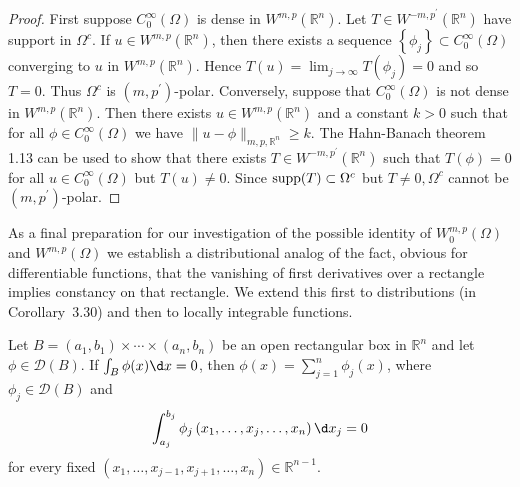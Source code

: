 \begin{proof}
  First suppose $C_0^{\infty}(\Omega)$ is dense in $W^{m,p}\left(\mathbb{R}^n\right)$. Let $T \in W^{-m, p^{\prime}}\left(\mathbb{R}^n\right)$ have support in $\Omega^c$. If $u \in W^{m,p}\left(\mathbb{R}^n\right)$, then there exists a sequence $\left\{\phi_j\right\} \subset C_0^{\infty}(\Omega)$ converging to $u$ in $W^{m,p}\left(\mathbb{R}^n\right)$. Hence $T(u)=\lim _{j \rightarrow \infty} T\left(\phi_j\right)=0$ and so $T=0$. Thus $\Omega^c$ is $\left(m, p^{\prime}\right)$-polar.
  Conversely, suppose that $C_0^{\infty}(\Omega)$ is not dense in $W^{m,p}\left(\mathbb{R}^n\right)$. Then there exists $u \in W^{m,p}\left(\mathbb{R}^n\right)$ and a constant $k>0$ such that for all $\phi \in C_0^{\infty}(\Omega)$ we have $\|u-\phi\|_{m, p, \mathbb{R}^n} \geq k$. The Hahn-Banach theorem 1.13 can be used to show that there exists $T \in W^{-m, p^{\prime}}\left(\mathbb{R}^n\right)$ such that $T(\phi)=0$ for all $u \in C_0^{\infty}(\Omega)$ but $T(u) \neq 0$. Since $\operatorname{supp}(T) \subset \Omega^c$ but $T \neq 0, \Omega^c$ cannot be $\left(m, p^{\prime}\right)$-polar.
\end{proof}

As a final preparation for our investigation of the possible identity of $W_0^{m, p}(\Omega)$ and $W^{m,p}(\Omega)$ we establish a distributional analog of the fact, obvious for differentiable functions, that the vanishing of first derivatives over a rectangle implies constancy on that rectangle. We extend this first to distributions (in Corollary~3.30) and then to locally integrable functions.


\begin{lemma}
  Let $B=\left(a_1, b_1\right) \times \cdots \times\left(a_n, b_n\right)$ be an open rectangular box in $\mathbb{R}^n$ and let $\phi \in \mathscr{D}(B)$. If $\int_B \phi(x) \d x=0$, then $\phi(x)=\sum_{j=1}^n \phi_j(x)$, where $\phi_j \in \mathscr{D}(B)$ and
  \begin{equation}\label{eq:3.8}
    \int_{a_j}^{b_j} \phi_j\left(x_1, \ldots, x_j, \ldots, x_n\right) \d x_j=0
  \end{equation}
  for every fixed $\left(x_1, \ldots, x_{j-1}, x_{j+1}, \ldots, x_n\right) \in \mathbb{R}^{n-1}$.
\end{lemma}

